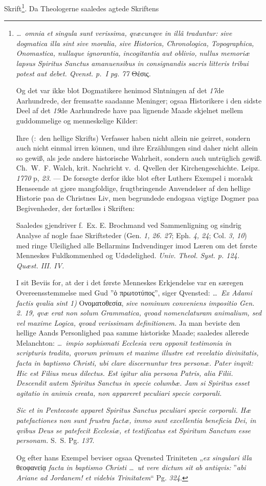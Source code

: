 \documentclass[12pt]{book}
\newcommand{\dsi}{\reflectbox{c}:}
\begin{document}
Skrift\footnote{\textit{\ldots\ omnia et singula sunt verissima, qvæcunqve in
illâ traduntur: sive dogmatica illa sint sive moralia, sive Historica,
Chronologica, Topographica, Onomastica, nullaque ignorantia, incogitantia aut
oblivio, nullus memoriæ lapsus Spiritus Sanctus amanuensibus in consignandis
sacris litteris tribui potest aut debet. Qvenst. p.~I pg. 77} Θέσις.

Og det var ikke blot Dogmatikere henimod Slntningen af det \textit{17}de
Aarhundrede, der fremsatte saadanne Meninger; ogsaa Historikere i den sidste
Deel af det \textit{19}de Aarhundrede have paa lignende Maade skjelnet mellem
guddommelige og menneskelige Kilder:

Ihre (\dsi\ den hellige Skrifts) Verfasser haben nicht allein nie geirret,
sondern auch nicht einmal irren können, und ihre Erzählungen sind daher nicht
allein so gewiß, als jede andere historische Wahrheit, sondern auch
untrüglich gewiß. Ch.~W.~F. Walch, krit. Nachricht v.~d. Qvellen der
Kirchengeschichte. Leipz. \textit{1770} p, \textit{23}. --- De forsøgte
derfor ikke blot efter Luthers Exempel i moralsk Henseende at gjøre
mangfoldige, frugtbringende Anvendelser af den hellige Historie paa de
Christnes Liv, men begrundede endogsaa vigtige Dogmer paa Begivenheder, der
fortælles i Skriften:

Saaledes gjendriver f.~Ex. E. Brochmand ved Sammenligning og sindrig Analyse
af nogle faae Skriftsteder (Gen. \textit{1, 26. 27}; Eph. \textit{4, 24};
Col. \textit{3, 10}) med ringe Uleilighed alle Bellarmins Indvendinger imod
Læren om det første Menneskes Fuldkommenhed og Udødelighed. \textit{Univ.
Theol. Syst. p. 124. Quæst. III. IV.}

I sit Beviis for, at der i det første Menneskes Erkjendelse var en særegen
Overeensstemmelse med Gud ”ὁ πρωτοτύπος”, siger Qvensted: \textit{\ldots\ Ex
Adami factis qvalia sint 1)} Ονοματοθεσία, \textit{sive nominum conveniens
impositio Gen. 2. 19, qvæ erat non solum \emph{Grammatica}, qvoad
nomenclaturam animalium, sed vel maxime \emph{Logica}, qvoad verissimam
definitionem.} Ja man beviste den hellige Aands Personlighed paa samme
historiske Maade; saaledes allerede Melanchton: \textit{\ldots\ impio
sophismati Ecclesia vera opponit testimonia in scripturis tradita, qvorum
primum et maxime illustre est revelatio divinitatis, facta in baptismo
Christi, ubi clare discernuntur tres personæ. Pater inqvit: Hic est Filius
meus dilectus. Est igitur alia persona Patris, alia Filii. Descendit autem
Spiritus Sanctus in specie columbæ. Jam si Spiritus esset agitatio in animis
creata, non appareret peculiari specie corporali.}

\textit{Sic et in Pentecoste apparet Spiritus Sanctus peculiari specie
corporali. Hæ patefactiones non sunt frustra factæ, immo sunt excellentia
beneficia Dei, in qvibus Deus se patefecit Ecclesiæ, et testificatus est
Spiritum Sanctum esse personam.} S.~S. Pg. \textit{137}.

Og efter hans Exempel beviser ogsaa Qvensted Triniteten „\textit{ex singulari
illa} θεοφανείᾳ \textit{facta in baptismo Christi \ldots\ ut vere dictum sit
ab antiqvis:} ”\textit{abi Ariane ad Jordanem! et videbis Trinitatem}“ Pg.
\textit{324}.}. Da Theologerne saaledes agtede Skriftens
\end{document}
